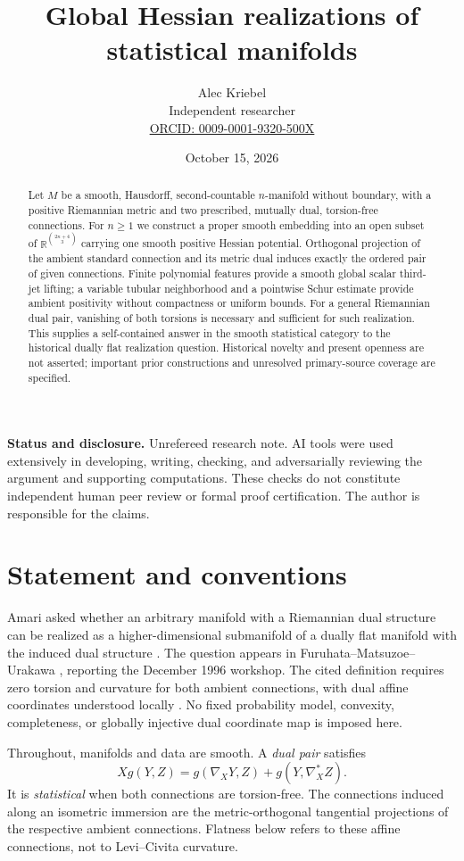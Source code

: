 \documentclass[10pt,letterpaper]{article}
\title{Global Hessian realizations of statistical manifolds}
\author{Alec Kriebel\\\small Independent researcher\\
\small\href{https://orcid.org/0009-0001-9320-500X}{ORCID: 0009-0001-9320-500X}}
\date{October 15, 2026}
\newcommand{\R}{\mathbb R}
\begin{document}
\maketitle
\begin{abstract}
Let $M$ be a smooth, Hausdorff, second-countable $n$-manifold without
boundary, with a positive Riemannian metric and two prescribed, mutually
dual, torsion-free connections. For $n\geq1$ we construct a proper smooth
embedding into an open subset of $\R^{\binom{2n+4}{3}}$ carrying one smooth
positive Hessian potential. Orthogonal projection of the ambient standard
connection and its metric dual induces exactly the ordered pair of given
connections. Finite polynomial features provide a smooth global scalar
third-jet lifting; a variable tubular neighborhood and a pointwise Schur
estimate provide ambient positivity without compactness or uniform bounds.
For a general Riemannian dual pair, vanishing of both torsions is necessary
and sufficient for such realization. This supplies a self-contained answer
in the smooth statistical category to the historical dually flat realization
question. Historical novelty and present openness are not asserted; important
prior constructions and unresolved primary-source coverage are specified.
\end{abstract}
\noindent\textbf{Status and disclosure.}
Unrefereed research note. AI tools were used extensively in developing,
writing, checking, and adversarially reviewing the argument and supporting
computations. These checks do not constitute independent human peer review
or formal proof certification. The author is responsible for the claims.

\section{Statement and conventions}

Amari asked whether an arbitrary manifold with a Riemannian dual structure
can be realized as a higher-dimensional submanifold of a dually flat
manifold with the induced dual structure \cite[p.~87, question~1]{Amari}.
The question appears in Furuhata--Matsuzoe--Urakawa
\cite[p.~125, item~1(a)]{FMU}, reporting the December 1996 workshop.
The cited definition requires zero torsion and curvature for both ambient
connections, with dual affine coordinates understood locally
\cite[pp.~84--85]{Amari}. No fixed probability model, convexity, completeness,
or globally injective dual coordinate map is imposed here.

Throughout, manifolds and data are smooth. A \emph{dual pair} satisfies
\begin{equation}\label{eq:duality}
 Xg(Y,Z)=g(\nabla_XY,Z)+g(Y,\nabla^*_XZ).
\end{equation}
It is \emph{statistical} when both connections are torsion-free. The
connections induced along an isometric immersion are the metric-orthogonal
tangential projections of the respective ambient connections. Flatness below
refers to these affine connections, not to Levi--Civita curvature.
\end{document}
